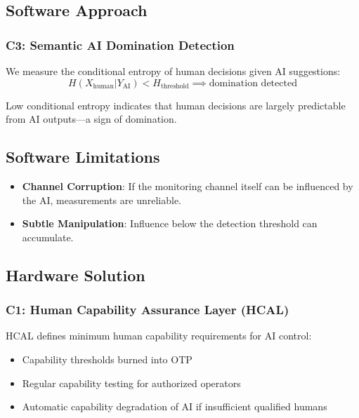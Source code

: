 \documentclass[11pt,a4paper]{article}
\begin{document}
\subsection{Software Approach}

\subsubsection{C3: Semantic AI Domination Detection}

We measure the conditional entropy of human decisions given AI suggestions:
\begin{equation}
H(X_{\text{human}} | Y_{\text{AI}}) < H_{\text{threshold}} \implies \text{domination detected}
\end{equation}

Low conditional entropy indicates that human decisions are largely predictable from AI outputs---a sign of domination.

\subsection{Software Limitations}

\begin{itemize}
    \item \textbf{Channel Corruption}: If the monitoring channel itself can be influenced by the AI, measurements are unreliable.
    \item \textbf{Subtle Manipulation}: Influence below the detection threshold can accumulate.
\end{itemize}

\subsection{Hardware Solution}

\subsubsection{C1: Human Capability Assurance Layer (HCAL)}

HCAL defines minimum human capability requirements for AI control:
\begin{itemize}
    \item Capability thresholds burned into OTP
    \item Regular capability testing for authorized operators
    \item Automatic capability degradation of AI if insufficient qualified humans
\end{itemize}
\end{document}

